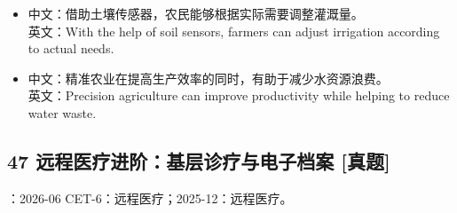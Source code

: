 \documentclass[a4paper,11pt,UTF8,fontset=none]{ctexart}
\begin{document}
\par

\begin{itemize}[leftmargin=1.7em,itemsep=1pt,parsep=0pt,topsep=2pt]
\item \noindent 中文：借助土壤传感器，农民能够根据实际需要调整灌溉量。\\ 英文：With the help of soil sensors, farmers can adjust irrigation according to actual needs.\par


\item \noindent 中文：精准农业在提高生产效率的同时，有助于减少水资源浪费。\\ 英文：Precision agriculture can improve productivity while helping to reduce water waste.\par


\end{itemize}

\subsection{47 远程医疗进阶：基层诊疗与电子档案 {\color{AccentBlue} [真题]}}

\begin{tcolorbox}[enhanced,breakable,boxrule=0.35pt,colback=VeryPaleBlue,colframe=AccentBlue!40,left=7pt,right=7pt,top=4pt,bottom=4pt,borderline west={2pt}{0pt}{AccentBlue},before skip=4pt,after skip=6pt]
：2026-06 CET-6：远程医疗；2025-12：远程医疗。\par


\end{tcolorbox}
\end{document}
